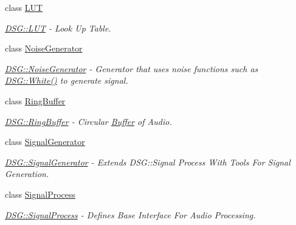 \begin{DoxyCompactItemize}
class \hyperlink{class_d_s_g_1_1_l_u_t}{L\+U\+T}
\begin{DoxyCompactList}\small\item\em \hyperlink{class_d_s_g_1_1_l_u_t}{D\+S\+G\+::\+L\+U\+T} -\/ Look Up Table. \end{DoxyCompactList}\item 
class \hyperlink{class_d_s_g_1_1_noise_generator}{Noise\+Generator}
\begin{DoxyCompactList}\small\item\em \hyperlink{class_d_s_g_1_1_noise_generator}{D\+S\+G\+::\+Noise\+Generator} -\/ Generator that uses noise functions such as \hyperlink{namespace_d_s_g_1_1_noise_a0d1c4b4522d2e56b1aa604e45ab92066}{D\+S\+G\+::\+White()} to generate signal. \end{DoxyCompactList}\item 
class \hyperlink{class_d_s_g_1_1_ring_buffer}{Ring\+Buffer}
\begin{DoxyCompactList}\small\item\em \hyperlink{class_d_s_g_1_1_ring_buffer}{D\+S\+G\+::\+Ring\+Buffer} -\/ Circular \hyperlink{class_d_s_g_1_1_buffer}{Buffer} of Audio. \end{DoxyCompactList}\item 
class \hyperlink{class_d_s_g_1_1_signal_generator}{Signal\+Generator}
\begin{DoxyCompactList}\small\item\em \hyperlink{class_d_s_g_1_1_signal_generator}{D\+S\+G\+::\+Signal\+Generator} -\/ Extends D\+S\+G\+::\+Signal Process With Tools For Signal Generation. \end{DoxyCompactList}\item 
class \hyperlink{class_d_s_g_1_1_signal_process}{Signal\+Process}
\begin{DoxyCompactList}\small\item\em \hyperlink{class_d_s_g_1_1_signal_process}{D\+S\+G\+::\+Signal\+Process} -\/ Defines Base Interface For Audio Processing. \end{DoxyCompactList}\end{DoxyCompactItemize}
